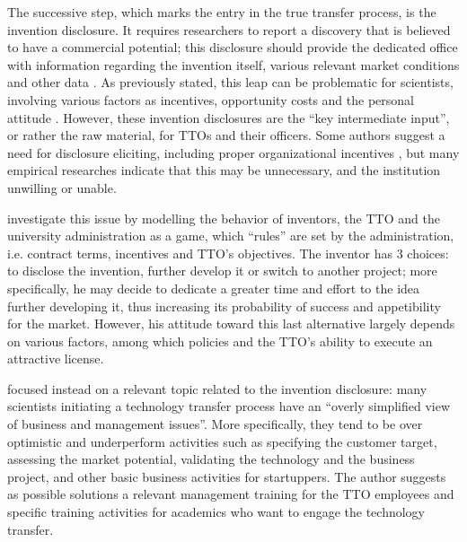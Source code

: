 The successive step, which marks the entry in the true transfer process, is the invention disclosure. It requires researchers to report a discovery that is believed to have a commercial potential; this disclosure should provide the dedicated office with information regarding the invention itself, various relevant market conditions and other data \citep{Thursby2002}. As previously stated, this leap can be problematic for scientists, involving various factors as incentives, opportunity costs and the personal attitude \citep{OwenSmith2001}. However, these invention disclosures are the \enquote{key intermediate input}, or rather the raw material, for TTOs and their officers. Some authors suggest a need for disclosure eliciting, including proper organizational incentives \citep{Siegel2003a}, but many empirical researches indicate that this may be unnecessary, and the institution unwilling or unable. 

\citet{Jensen2003} investigate this issue by modelling the behavior of inventors, the TTO and the university administration as a game, which \enquote{rules} are set by the administration, i.e. contract terms, incentives and TTO's objectives. The inventor has 3 choices: to disclose the invention, further develop it or switch to another project; more specifically, he may decide to dedicate a greater time and effort to the idea further developing it, thus increasing its probability of success and appetibility for the market. However, his attitude toward this last alternative largely depends on various factors, among which policies and the TTO's ability to execute an attractive license.

\citet{McAdam2005} focused instead on a relevant topic related to the invention disclosure: many scientists initiating a technology transfer process have an \enquote{overly simplified view of business and management issues}. More specifically, they tend to be over optimistic and underperform activities such as specifying the customer target, assessing the market potential, validating the technology and the business project, and other basic business activities for startuppers. The author suggests as possible solutions a relevant management training for the TTO employees and specific training activities for academics who want to engage the technology transfer.

